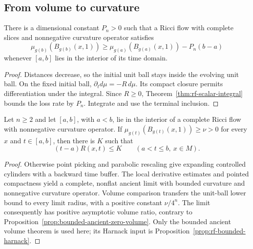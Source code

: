 \subsection{From volume to curvature}

\begin{lemma}\label{lem:rf-volume-loss}
There is a dimensional constant $P_n>0$ such that a Ricci flow
with complete slices and nonnegative curvature operator satisfies
\[
 \mu_{g(b)}(B_{g(b)}(x,1))
 \geq\mu_{g(a)}(B_{g(a)}(x,1))-P_n(b-a)
\]
whenever $[a,b]$ lies in the interior of its time domain.
\end{lemma}
\begin{proof}
Distances decrease, so the initial unit ball stays inside the evolving
unit ball. On the fixed initial ball,
$\partial_t d\mu=-R\,d\mu$. Its compact closure permits differentiation
under the integral. Since $R\geq0$, Theorem~\ref{thm:rf-scalar-integral}
bounds the loss rate by $P_n$. Integrate and use the terminal inclusion.
\end{proof}

\begin{lemma}\label{lem:rf-time-scalar}
Let $n\geq2$ and let $[a,b]$, with $a<b$, lie in the interior
of a complete Ricci flow with nonnegative curvature operator.
If $\mu_{g(t)}(B_{g(t)}(x,1))\geq\nu>0$ for every $x$ and
$t\in[a,b]$, then there is $K$ such that
\[
                (t-a)R(x,t)\leq K\qquad(a<t\leq b,\ x\in M).
\]
\end{lemma}
\begin{proof}
Otherwise point picking and parabolic rescaling give expanding
controlled cylinders with a backward time buffer. The local
derivative estimates and pointed compactness yield a complete,
nonflat ancient limit with bounded curvature and nonnegative
curvature operator. Volume comparison transfers the unit-ball
lower bound to every limit radius, with a positive constant
$\nu/4^n$. The limit consequently has positive asymptotic volume
ratio, contrary to Proposition~\ref{prop:bounded-ancient-zero-volume}.
Only the bounded ancient volume theorem is used here; its Harnack
input is Proposition~\ref{prop:rf-bounded-harnack}.
\end{proof}


